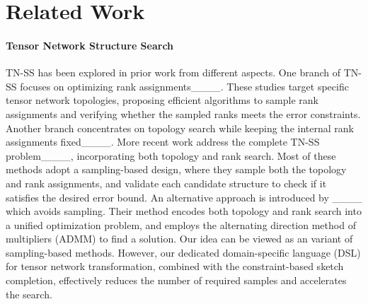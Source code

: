\section{Related Work}
\label{sec:related}
\paragraph{Tensor Network Structure Search}
%
TN-SS has been explored in prior work from different aspects.
%
One branch of TN-SS focuses on optimizing rank assignments____.
%
These studies target specific tensor network topologies, proposing efficient algorithms to sample rank assignments and verifying whether the sampled ranks meets the error constraints.
%
Another branch concentrates on topology search while keeping the internal rank assignments fixed____.
%
More recent work address the complete TN-SS problem____, incorporating both topology and rank search.
%
Most of these methods adopt a sampling-based design, where they sample both the topology and rank assignments, and validate each candidate structure to check if it satisfies the desired error bound.
%
An alternative approach is introduced by ____ which avoids sampling.
%
Their method encodes both topology and rank search into a unified optimization problem, and employs the alternating direction method of multipliers (ADMM) to find a solution.
%
Our idea can be viewed as an variant of sampling-based methods.
%
However, our dedicated domain-specific language (DSL) for tensor network transformation, combined with the constraint-based sketch completion, effectively reduces the number of required samples and accelerates the search.
%
